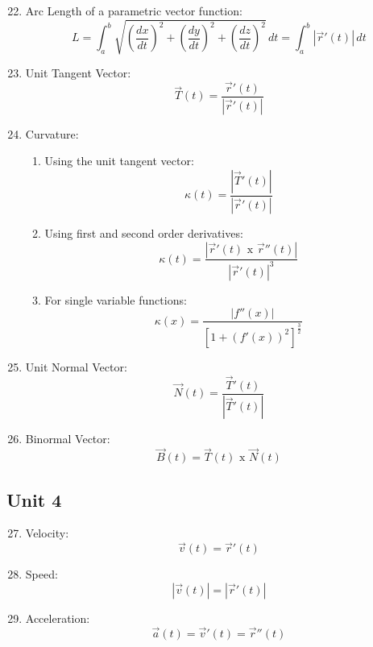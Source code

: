 \documentclass[12pt]{article}
\begin{document}
\begin{enumerate}
    \setcounter{enumi}{21}

  \item Arc Length of a parametric vector function:
        $$L=\int_a^b\sqrt{\left(\frac{dx}{dt}\right)^2+\left(\frac{dy}{dt}\right)^2+\left(\frac{dz}{dt}\right)^2}\,dt=\int_a^b |\overrightarrow{r}'(t)|\,dt$$

      \item Unit Tangent Vector:
        $$\overrightarrow{T}(t)=\frac{\overrightarrow{r}'(t)}{|\overrightarrow{r}'(t)|}$$

      \item Curvature:
        \begin{enumerate}

          \item Using the unit tangent vector:
            $$\kappa(t)=\frac{|\overrightarrow{T}'(t)|}{|\overrightarrow{r}'(t)|}$$

          \item Using first and second order derivatives:
            $$\kappa(t)=\frac{|\overrightarrow{r}'(t)\text{ x }\overrightarrow{r}''(t)|}{|\overrightarrow{r}'(t)|^3}$$

          \item For single variable functions:
            $$\kappa(x)=\frac{|f''(x)|}{[1+(f'(x))^2]^{\frac{3}{2}}}$$

        \end{enumerate}

      \item Unit Normal Vector:
        $$\overrightarrow{N}(t)=\frac{\overrightarrow{T}'(t)}{|\overrightarrow{T}'(t)|}$$

      \item Binormal Vector:
        $$\overrightarrow{B}(t)=\overrightarrow{T}(t)\text{ x }\overrightarrow{N}(t)$$
    \end{enumerate}

\subsection{Unit 4}

\begin{enumerate}
    \setcounter{enumi}{26}

  \item Velocity:
    $$\overrightarrow{v}(t)=\overrightarrow{r}'(t)$$

  \item Speed:
    $$|\overrightarrow{v}(t)|=|\overrightarrow{r}'(t)|$$

  \item Acceleration:
    $$\overrightarrow{a}(t)=\overrightarrow{v}'(t)=\overrightarrow{r}''(t)$$
\end{enumerate}
\end{document}
